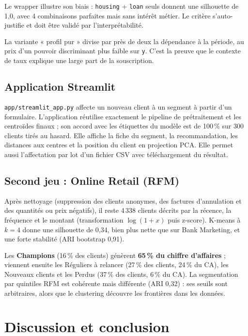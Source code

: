 \documentclass[11pt,a4paper]{article}
\begin{document}
Le wrapper illustre son biais : \texttt{housing} + \texttt{loan} seuls donnent une silhouette de 1,0, avec 4 combinaisons parfaites mais sans intérêt métier. Le critère s'auto-justifie et doit être validé par l'interprétabilité.

La variante « profil pur » divise par près de deux la dépendance à la période, au prix d'un pouvoir discriminant plus faible sur \texttt{y}. C'est la preuve que le contexte de taux explique une large part de la souscription.

\subsection{Application Streamlit}
\texttt{app/streamlit\_app.py} affecte un nouveau client à un segment à partir d'un formulaire. L'application réutilise exactement le pipeline de prétraitement et les centroïdes finaux ; son accord avec les étiquettes du modèle est de 100\,\% sur 300 clients tirés au hasard. Elle affiche la fiche du segment, la recommandation, les distances aux centres et la position du client en projection PCA. Elle permet aussi l'affectation par lot d'un fichier CSV avec téléchargement du résultat.

\subsection{Second jeu : Online Retail (RFM)}
Après nettoyage (suppression des clients anonymes, des factures d'annulation et des quantités ou prix négatifs), il reste 4\,338 clients décrits par la récence, la fréquence et le montant (transformation $\log(1+x)$ puis z-score). K-means à $k=4$ donne une silhouette de 0,34, bien plus nette que sur Bank Marketing, et une forte stabilité (ARI bootstrap 0,91).

Les \textbf{Champions} (16\,\% des clients) génèrent \textbf{65\,\% du chiffre d'affaires} ; viennent ensuite les Réguliers à relancer (27\,\% des clients, 24\,\% du CA), les Nouveaux clients et les Perdus (37\,\% des clients, 6\,\% du CA). La segmentation par quintiles RFM est cohérente mais différente (ARI 0,32) : ses seuils sont arbitraires, alors que le clustering découvre les frontières dans les données.

\section{Discussion et conclusion}
\end{document}
